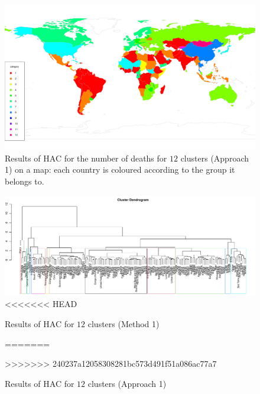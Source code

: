 \documentclass[a4paper,12pt]{article}
\numberwithin{equation}{section}
\begin{document}
\begin{figure}[t!]
\begin{minipage}[t]{0.98\textwidth}
\includegraphics[width=\textwidth]{plots/deaths/map}
\caption{Results of HAC for the number of deaths for $12$ clusters (Approach 1) on a map: each country is coloured according to the group it belongs to.}\label{fig:map_deaths}
\end{minipage}
\end{figure}



\newpage 
\FloatBarrier
\begin{figure}
\includegraphics[width=\textwidth]{plots/14days/dendrogram}
<<<<<<< HEAD
\caption{Results of HAC for $12$ clusters (Method 1)}\label{fig:dend}
=======
\caption{Results of HAC for $12$ clusters (Approach 1)}\label{fig:dend}
>>>>>>> 240237a12058308281bc573d491f51a086ac77a7
\end{figure}
\end{document}
